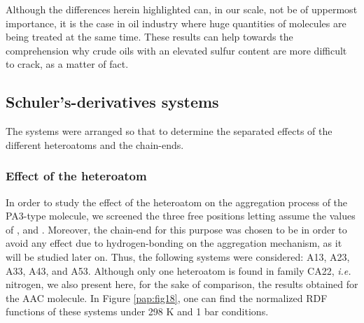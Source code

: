 Although the differences herein highlighted can, in our scale, not be of uppermost importance, it is the case in oil industry where huge quantities of molecules are being treated at the same time. These results can help towards the comprehension why crude oils with an elevated sulfur content are more difficult to crack, as a matter of fact. 


\clearpage

\subsection{Schuler's-derivatives systems}

The systems were arranged so that to determine the separated effects of the different heteroatoms and the chain-ends.

\subsubsection{Effect of the heteroatom}

In order to study the effect of the heteroatom on the aggregation process of the PA3-type molecule, we screened the three free positions letting  assume the values of ,  and . Moreover, the chain-end for this purpose was chosen to be  in order to avoid any effect due to hydrogen-bonding on the aggregation mechanism, as it will be studied later on. Thus, the following systems were considered: A13, A23, A33, A43, and A53. Although only one heteroatom is found in family CA22, \textit{i.e.} nitrogen, we also present here, for the sake of comparison, the results obtained for the AAC molecule. In Figure \ref{pap:fig18}, one can find the normalized RDF functions  of these systems under 298 K and 1 bar conditions.

